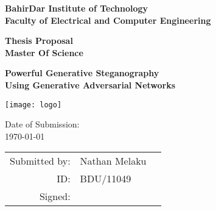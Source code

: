 \begin{center}
	{\LARGE\bf BahirDar Institute of Technology \\
	\vspace{0.25\baselineskip}
	Faculty of Electrical and Computer Engineering}
	\vspace{\baselineskip}
	
	{\Large\bf Thesis Proposal \\
	\vspace{0.25\baselineskip}
	Master Of Science}
	\vspace{\baselineskip}
	
	\vspace{2\baselineskip}
	{\LARGE\bf Powerful Generative Steganography \\ 
		\vspace{0.25\baselineskip}
			Using Generative Adversarial Networks}
		\vspace{3\baselineskip}
		
		\texttt{[image: logo]}
		
		\vfill
		
		Date of Submission: \\
		\today
		\vspace{0.5\baselineskip}
		
		\begin{tabular}{rlc}
			{\small \sc Submitted by:} & Nathan Melaku & \\
			{\small \sc  ID:} & BDU/11049 & \\
			{\small \sc Signed:} & \cline{1-1}  \\						
		\end{tabular}
\end{center}